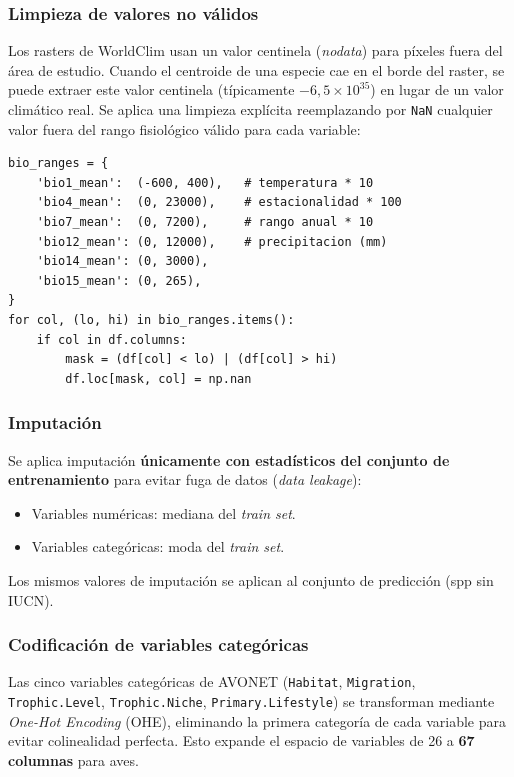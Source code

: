 \documentclass[12pt,a4paper]{article}
\begin{document}
\subsubsection{Limpieza de valores no válidos}

Los rasters de WorldClim usan un valor centinela (\textit{nodata}) para píxeles fuera del área
de estudio.  Cuando el centroide de una especie cae en el borde del raster, se puede extraer
este valor centinela (típicamente $-6{,}5 \times 10^{35}$) en lugar de un valor climático real.
Se aplica una limpieza explícita reemplazando por \texttt{NaN} cualquier valor fuera del
rango fisiológico válido para cada variable:

\begin{samepage}
\begin{lstlisting}[caption={Limpieza de nodata en variables bioclimáticas.}]
bio_ranges = {
    'bio1_mean':  (-600, 400),   # temperatura * 10
    'bio4_mean':  (0, 23000),    # estacionalidad * 100
    'bio7_mean':  (0, 7200),     # rango anual * 10
    'bio12_mean': (0, 12000),    # precipitacion (mm)
    'bio14_mean': (0, 3000),
    'bio15_mean': (0, 265),
}
for col, (lo, hi) in bio_ranges.items():
    if col in df.columns:
        mask = (df[col] < lo) | (df[col] > hi)
        df.loc[mask, col] = np.nan
\end{lstlisting}
\end{samepage}

\subsubsection{Imputación}

Se aplica imputación \textbf{únicamente con estadísticos del conjunto de entrenamiento}
para evitar fuga de datos (\textit{data leakage}):
\begin{itemize}[nosep]
  \item Variables numéricas: mediana del \textit{train set}.
  \item Variables categóricas: moda del \textit{train set}.
\end{itemize}
Los mismos valores de imputación se aplican al conjunto de predicción (spp sin IUCN).

\subsubsection{Codificación de variables categóricas}

Las cinco variables categóricas de AVONET (\texttt{Habitat}, \texttt{Migration},
\texttt{Trophic.Level}, \texttt{Trophic.Niche}, \texttt{Primary.Lifestyle}) se transforman
mediante \textit{One-Hot Encoding} (OHE), eliminando la primera categoría de cada variable
para evitar colinealidad perfecta.
Esto expande el espacio de variables de 26 a \textbf{67 columnas} para aves.
\end{document}
